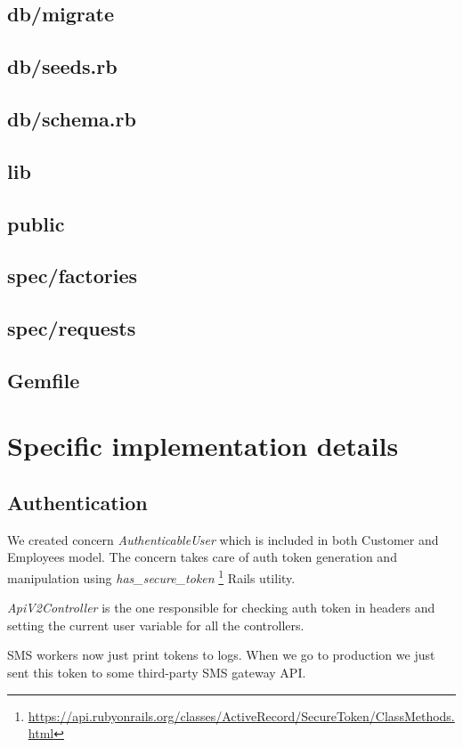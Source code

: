	\subsection{db/migrate}
	\subsection{db/seeds.rb}
	\subsection{db/schema.rb}
	\subsection{lib}
	\subsection{public}
	\subsection{spec/factories}
	\subsection{spec/requests}
	\subsection{Gemfile}

\section {Specific implementation details}
\subsection {Authentication}
We created concern \textit{AuthenticableUser} which is included in both Customer and Employees model. The concern takes care of auth token generation and manipulation using \textit{has\_secure\_token} \footnote{\url{https://api.rubyonrails.org/classes/ActiveRecord/SecureToken/ClassMethods.html}} Rails utility. 

\textit{ApiV2Controller} is the one responsible for checking auth token in headers and setting the current user variable for all the controllers.

SMS workers now just print tokens to logs. When we go to production we just sent this token to some third-party SMS gateway API.

